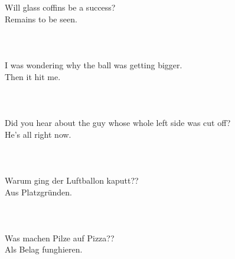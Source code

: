 
\usepackage{blindtext}



Will glass coffins be a success?\\
 Remains to be seen.\\\\

\blindtext
\blindtext \\\\



I was wondering why the ball was getting bigger.\\
 Then it hit me.\\\\


\blindtext
\blindtext\\\\

Did you hear about the guy whose whole left side was cut off?\\
 He's all right now.\\\\

\blindtext
\blindtext\\\\

Warum ging der Luftballon kaputt??\\
Aus Platzgründen.\\\\

\blindtext
\blindtext\\\\

Was machen Pilze auf Pizza??\\
Als Belag funghieren.\\\\
